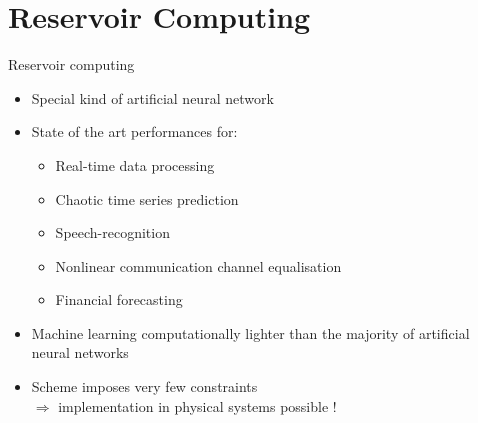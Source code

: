 \section{Reservoir Computing}

\begin{frame}{Reservoir computing}

	\begin{itemize}
		\item Special kind of artificial neural network
		\item State of the art performances for:
		\begin{itemize}
			\item Real-time data processing
			\item Chaotic time series prediction
			\item Speech-recognition
			\item Nonlinear communication channel equalisation
			\item Financial forecasting
		\end{itemize}
		\item Machine learning computationally lighter than the majority of artificial neural networks
		\item Scheme imposes very few constraints \\$\Longrightarrow$ implementation in physical systems possible !
	\end{itemize}

\end{frame}


